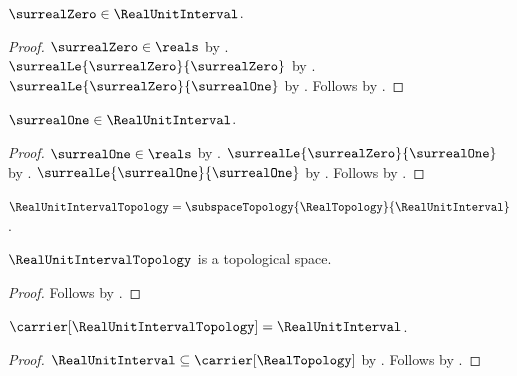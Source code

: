 \begin{proposition}\label{surreal_zero_in_real_unit_interval}
    $\surrealZero\in\RealUnitInterval$.
\end{proposition}
\begin{proof}
    $\surrealZero\in\reals$ by .
    $\surrealLe{\surrealZero}{\surrealZero}$
        by .
    $\surrealLe{\surrealZero}{\surrealOne}$
        by .
    Follows by .
\end{proof}

\begin{proposition}\label{surreal_one_in_real_unit_interval}
    $\surrealOne\in\RealUnitInterval$.
\end{proposition}
\begin{proof}
    $\surrealOne\in\reals$ by .
    $\surrealLe{\surrealZero}{\surrealOne}$
        by .
    $\surrealLe{\surrealOne}{\surrealOne}$
        by .
    Follows by .
\end{proof}

\begin{definition}\label{real_unit_interval_topology}
    $\RealUnitIntervalTopology=
        \subspaceTopology{\RealTopology}{\RealUnitInterval}$.
\end{definition}

\begin{classification}\label{real_unit_interval_topology_is_topological_space}
    $\RealUnitIntervalTopology$ is a topological space.
\end{classification}
\begin{proof}
    Follows by
        .
\end{proof}

\begin{proposition}\label{real_unit_interval_topology_carrier}
    $\carrier[\RealUnitIntervalTopology]=\RealUnitInterval$.
\end{proposition}
\begin{proof}
    $\RealUnitInterval\subseteq\carrier[\RealTopology]$
        by
        .
    Follows by
        .
\end{proof}

